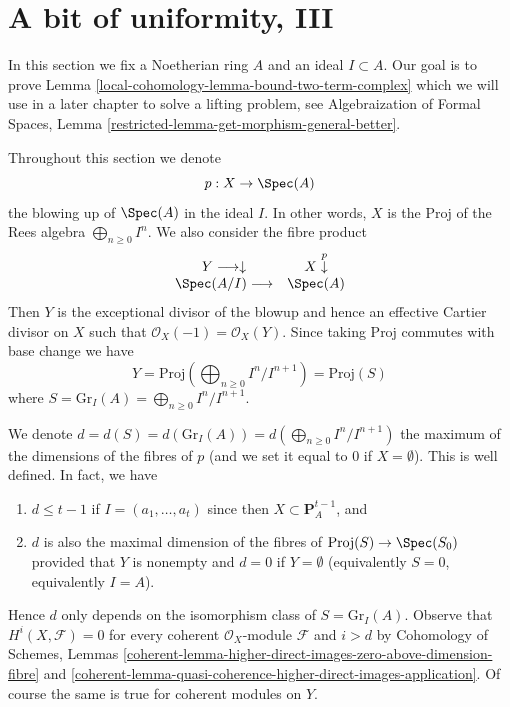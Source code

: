 \section{A bit of uniformity, III}
\label{local-cohomology-section-uniform}
In this section we fix a Noetherian ring $A$ and an ideal $I \subset A$.
Our goal is to prove Lemma \ref{local-cohomology-lemma-bound-two-term-complex} which we will
use in a later chapter to solve a lifting problem, see
Algebraization of Formal Spaces, Lemma
\ref{restricted-lemma-get-morphism-general-better}.

\medskip\noindent
Throughout this section we denote
$$
p : X \to \Spec(A)
$$
the blowing up of $\Spec(A)$ in the ideal $I$. In other words, $X$ is the
$\text{Proj}$ of the Rees algebra $\bigoplus_{n \geq 0} I^n$. We also consider
the fibre product
$$
\begin{array}{cc}Y \longrightarrow\downarrow & X \overset{p}{\downarrow} \\ \Spec(A/I) \longrightarrow & \Spec(A)\end{array}
$$
Then $Y$ is the exceptional divisor of the blowup and hence
an effective Cartier divisor on $X$ such that
$\mathcal{O}_X(-1) = \mathcal{O}_X(Y)$. Since taking $\text{Proj}$
commutes with base change we have
$$
Y = \text{Proj}(\bigoplus\nolimits_{n \geq 0} I^n/I^{n + 1}) = \text{Proj}(S)
$$
where $S = \text{Gr}_I(A) = \bigoplus_{n \geq 0} I^n/I^{n + 1}$.

\medskip\noindent
We denote
$d = d(S) = d(\text{Gr}_I(A)) = d(\bigoplus_{n \geq 0} I^n/I^{n + 1})$
the maximum of the dimensions of the fibres of $p$
(and we set it equal to $0$ if $X = \emptyset$).
This is well defined. In fact, we have
\begin{enumerate}
\item $d \leq t - 1$ if $I = (a_1, \ldots, a_t)$ since then
$X \subset \mathbf{P}^{t - 1}_A$, and
\item $d$ is also the maximal dimension of the fibres of
$\text{Proj}(S) \to \Spec(S_0)$ provided that $Y$
is nonempty and $d = 0$ if $Y = \emptyset$
(equivalently $S = 0$, equivalently $I = A$).
\end{enumerate}
Hence $d$ only depends on the isomorphism class of $S = \text{Gr}_I(A)$.
Observe that $H^i(X, \mathcal{F}) = 0$ for every coherent
$\mathcal{O}_X$-module $\mathcal{F}$ and $i > d$ by
Cohomology of Schemes, Lemmas
\ref{coherent-lemma-higher-direct-images-zero-above-dimension-fibre} and
\ref{coherent-lemma-quasi-coherence-higher-direct-images-application}.
Of course the same is true for coherent modules on $Y$.

